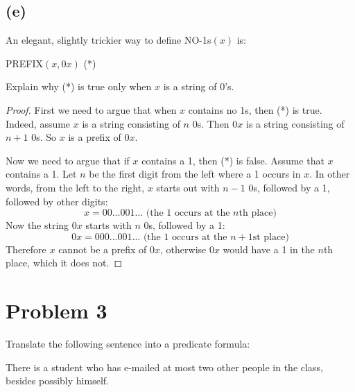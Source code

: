 \documentclass[14pt]{extarticle}
\begin{document}
\subsection{(e)}
An elegant, slightly trickier way to define NO-1s$(x)$ is:

\begin{center}
    PREFIX$(x, 0x)$ (*)
\end{center}

Explain why (*) is true only when $x$ is a string of 0’s.
\begin{proof}
    First we need to argue that when $x$ contains no 1s, then (*) is true. Indeed, assume $x$ is a string consisting of $n$ 0s. Then $0x$ is a string consisting of $n+1$ 0s. So $x$ is a prefix of $0x$.

    Now we need to argue that if $x$ contains a 1, then (*) is false. Assume that $x$ contains a 1. Let $n$ be the first digit from the left where a 1 occurs in $x$. In other words, from the left to the right, $x$ starts out with $n - 1$ 0s, followed by a 1, followed by other digits:
    $$
        x = 00 \ldots 001 \ldots \text{   (the 1 occurs at the $n$th place)}
    $$
    Now the string $0x$ starts with $n$ 0s, followed by a 1:
    $$
        0x = 000 \ldots 001 \ldots \text{   (the 1 occurs at the $n+1$st place)}
    $$
    Therefore $x$ cannot be a prefix of $0x$, otherwise $0x$ would have a 1 in the $n$th place, which it does not.
\end{proof}

\section{Problem 3}
Translate the following sentence into a predicate formula:

There is a student who has e-mailed at most two other people in the class, besides possibly himself.
\end{document}
